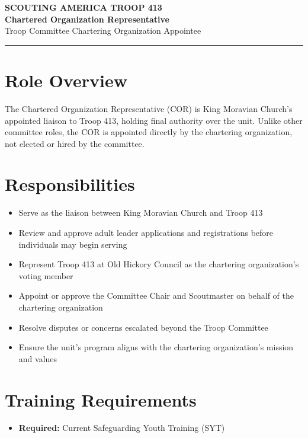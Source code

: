 \documentclass[11pt, letterpaper]{article}
\begin{document}
\begin{center}
  {\small\color{scoutgreen}\textbf{SCOUTING AMERICA \textbullet{} TROOP 413}} \\[4pt]
  {\fontsize{20pt}{24pt}\selectfont\bfseries\color{scoutgreen} Chartered Organization Representative} \\[4pt]
  {\large\color{accent} Troop Committee \textbullet{} Chartering Organization Appointee} \\[4pt]
  \textcolor{accent}{\rule{0.6\linewidth}{1pt}}
\end{center}

\vspace{0.3em}

\begin{minipage}[t]{0.48\linewidth}
\raggedright

\section{Role Overview}
The Chartered Organization Representative (COR) is King Moravian Church's appointed liaison to Troop 413, holding final authority over the unit. Unlike other committee roles, the COR is appointed directly by the chartering organization, not elected or hired by the committee.

\vspace{0.4em}
\section{Responsibilities}
\begin{itemize}
  \item Serve as the liaison between King Moravian Church and Troop 413
  \item Review and approve adult leader applications and registrations before individuals may begin serving
  \item Represent Troop 413 at Old Hickory Council as the chartering organization's voting member
  \item Appoint or approve the Committee Chair and Scoutmaster on behalf of the chartering organization
  \item Resolve disputes or concerns escalated beyond the Troop Committee
  \item Ensure the unit's program aligns with the chartering organization's mission and values
\end{itemize}

\section{Training Requirements}
\begin{itemize}
  \item \textbf{Required:} Current Safeguarding Youth Training (SYT)
\end{itemize}

\end{minipage}
\end{document}
